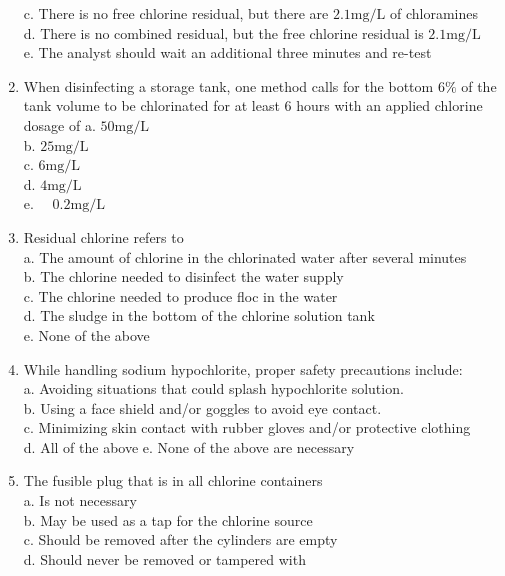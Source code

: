 \begin{enumerate}[1.]
c. There is no free chlorine residual, but there are $2.1 \mathrm{mg} / \mathrm{L}$ of chloramines\\
d. There is no combined residual, but the free chlorine residual is $2.1 \mathrm{mg} / \mathrm{L}$\\
e. The analyst should wait an additional three minutes and re-test\\
\item When disinfecting a storage tank, one method calls for the bottom $6 \%$ of the tank volume to be chlorinated for at least 6 hours with an applied chlorine dosage of a. $50 \mathrm{mg} / \mathrm{L}$\\
b. $25 \mathrm{mg} / \mathrm{L}$\\
c. $6 \mathrm{mg} / \mathrm{L}$\\
d. $4 \mathrm{mg} / \mathrm{L}$\\
e. $\quad 0.2 \mathrm{mg} / \mathrm{L}$\\
\item Residual chlorine refers to\\
a. The amount of chlorine in the chlorinated water after several minutes\\
b. The chlorine needed to disinfect the water supply\\
c. The chlorine needed to produce floc in the water\\
d. The sludge in the bottom of the chlorine solution tank\\
e. None of the above\\
\item While handling sodium hypochlorite, proper safety precautions include:\\
a. Avoiding situations that could splash hypochlorite solution.\\
b. Using a face shield and/or goggles to avoid eye contact.\\
c. Minimizing skin contact with rubber gloves and/or protective clothing\\
d. All of the above e. None of the above are necessary\\
\item The fusible plug that is in all chlorine containers\\
a. Is not necessary\\
b. May be used as a tap for the chlorine source\\
c. Should be removed after the cylinders are empty\\
d. Should never be removed or tampered with\\

\end{enumerate}
